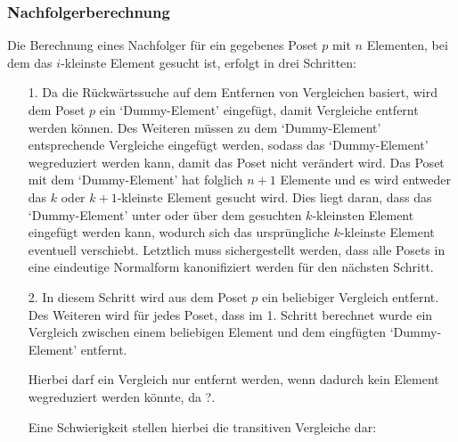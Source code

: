 \documentclass[10pt,journal,compsoc]{IEEEtran}
\begin{document}
\subsubsection{Nachfolgerberechnung}
Die Berechnung eines Nachfolger für ein gegebenes Poset $p$ mit $n$ Elementen, bei dem das $i$-kleinste Element gesucht ist, erfolgt in drei Schritten:
\begin{itemize}
  \item[1.]
    Da die Rückwärtssuche auf dem Entfernen von Vergleichen basiert, wird dem Poset $p$ ein `Dummy-Element' eingefügt, damit Vergleiche entfernt werden können.
    Des Weiteren müssen zu dem `Dummy-Element' entsprechende Vergleiche eingefügt werden, sodass das `Dummy-Element' wegreduziert werden kann, damit das Poset nicht verändert wird.
    Das Poset mit dem `Dummy-Element' hat folglich $n + 1$ Elemente und es wird entweder das $k$ oder $k + 1$-kleinste Element gesucht wird.
    Dies liegt daran, dass das `Dummy-Element' unter oder über dem gesuchten $k$-kleinsten Element eingefügt werden kann, wodurch sich das ursprüngliche $k$-kleinste Element eventuell verschiebt.
    Letztlich muss sichergestellt werden, dass alle Posets in eine eindeutige Normalform kanonifiziert werden für den nächsten Schritt.

  \item[2.]
    In diesem Schritt wird aus dem Poset $p$ ein beliebiger Vergleich entfernt.
    Des Weiteren wird für jedes Poset, dass im 1. Schritt berechnet wurde ein Vergleich zwischen einem beliebigen Element und dem eingfügten `Dummy-Element' entfernt.

    Hierbei darf ein Vergleich nur entfernt werden, wenn dadurch kein Element wegreduziert werden könnte, da ?. %

    Eine Schwierigkeit stellen hierbei die transitiven Vergleiche dar: \\
    \begin{figure}
\end{figure}
\end{itemize}
\end{document}
